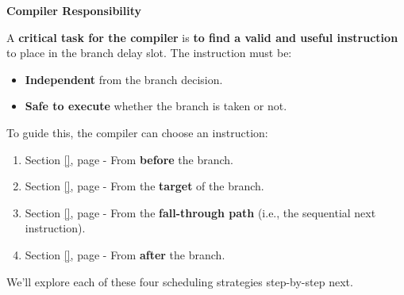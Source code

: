 \highspace
\begin{flushleft}
    \textcolor{Red2}{ \textbf{Compiler Responsibility}}
\end{flushleft}
A \textbf{critical task for the compiler} is \textbf{to find a valid and useful instruction} to place in the branch delay slot. The instruction must be:
\begin{itemize}
    \item \textbf{Independent} from the branch decision.
    \item \textbf{Safe to execute} whether the branch is taken or not.
\end{itemize}
To guide this, the compiler can choose an instruction:
\begin{enumerate}
    \item Section \ref{}, page \pageref{} - From \textbf{before} the branch.
    \item Section \ref{}, page \pageref{} - From the \textbf{target} of the branch.
    \item Section \ref{}, page \pageref{} - From the \textbf{fall-through path} (i.e., the sequential next instruction).
    \item Section \ref{}, page \pageref{} - From \textbf{after} the branch.
\end{enumerate}
We'll explore each of these four scheduling strategies step-by-step next.